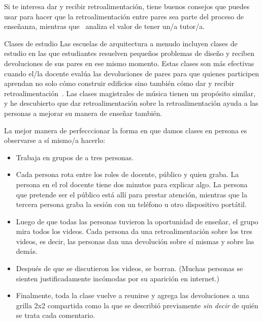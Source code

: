 Si te interesa dar y recibir retroalimentación,
\cite{Gorm2014} tiene buenos consejos
que puedes usar para hacer que la retroalimentación entre pares sea parte del proceso de enseñanza,
mientras que~\cite{Gawa2011} analiza el valor de tener un/a tutor/a.

\begin{aside}{Clases de estudio}
  Las escuelas de arquitectura a menudo incluyen clases de estudio
  en las que estudiantes resuelven pequeños problemas de diseño
  y reciben devoluciones de sus pares en ese mismo momento.
  Estas clases son más efectivas cuando el/la docente evalúa las devoluciones de pares
  para que quienes participen aprendan no solo cómo construir edificios
  sino también cómo dar y recibir retroalimentación~\cite{Scho1984}.
  Las clases magistrales de música tienen un propósito similar,
  y he descubierto que dar retroalimentación sobre la retroalimentación
  ayuda a las personas a mejorar su manera de enseñar también.
\end{aside}


La mejor manera de perfecccionar la forma en que damos clases en persona es observarse a sí mismo/a hacerlo:

\begin{itemize}

\item
  Trabaja en grupos de a tres personas.

\item
  Cada persona rota entre los roles de docente, público y quien graba.
  La persona en el rol docente tiene dos minutos para explicar algo.
  La persona que pretende ser el público está allí para prestar atención,
  mientras que la tercera persona graba la sesión con un teléfono u otro dispositivo portátil.

\item
  Luego de que todas las personas tuvieron la oportunidad de enseñar,
  el grupo mira todos los videos.
  Cada persona da una retroalimentación sobre los tres videos,
  es decir, las personas dan una devolución sobre sí mismas y sobre las demás.
 
\item
  Después de que se discutieron los videos,
  se borran.
  (Muchas personas se sienten justificadamente incómodas por su aparición en internet.)

\item
  Finalmente,
  toda la clase vuelve a reunirse
  y agrega las devoluciones a una grilla 2x2 compartida como la que se describió previamente
  \emph{sin decir} de quién se trata cada comentario.

\end{itemize}

